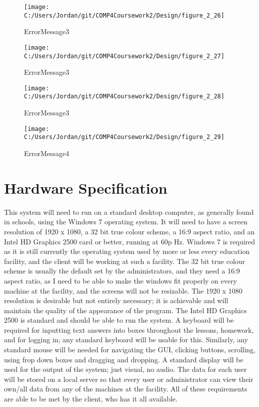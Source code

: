 \begin{figure}[H]
    \label{fig:print_function_result}\caption{ErrorMessage3}
    \texttt{[image: C:/Users/Jordan/git/COMP4Coursework2/Design/figure\_2\_26]}
\end{figure}

\begin{figure}[H]
    \label{fig:print_function_result}\caption{ErrorMessage3}
    \texttt{[image: C:/Users/Jordan/git/COMP4Coursework2/Design/figure\_2\_27]}
\end{figure}

\begin{figure}[H]
    \label{fig:print_function_result}\caption{ErrorMessage3}
    \texttt{[image: C:/Users/Jordan/git/COMP4Coursework2/Design/figure\_2\_28]}
\end{figure}

\begin{figure}[H]
    \label{fig:print_function_result}\caption{ErrorMessage4}
    \texttt{[image: C:/Users/Jordan/git/COMP4Coursework2/Design/figure\_2\_29]}
\end{figure}

\section{Hardware Specification}

This system will need to run on a standard desktop computer, as generally found in schools, using the Windows 7 operating system. It will need to have a screen resolution of 1920 x 1080, a 32 bit true colour scheme, a 16:9 aspect ratio, and an Intel HD Graphics 2500 card or better, running at 60p Hz. Windows 7 is required as it is still currently the operating system used by more or less every education facility, and the client will be working at such a facility. The 32 bit true colour scheme is usually the default set by the administrators, and they need a 16:9 aspect ratio, as I need to be able to make the windows fit properly on every machine at the facility, and the screens will not be resizable. The 1920 x 1080 resolution is desirable but not entirely necessary; it is achievable and will maintain the quality of the appearance of the program. The Intel HD Graphics 2500 is standard and should be able to run the system. A keyboard will be required for inputting text answers into boxes throughout the lessons, homework, and for logging in; any standard keyboard will be usable for this. Similarly, any standard mouse will be needed for navigating the GUI, clicking buttons, scrolling, using frop down boxes and dragging and dropping. A standard display will be used for the output of the system; just visual, no audio. The data for each user will be stored on a local server so that every user or administrator can view their own/all data from any of the machines at the facility. All of these requirements are able to be met by the client, who has it all available.

